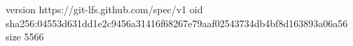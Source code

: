 version https://git-lfs.github.com/spec/v1
oid sha256:04553d631dd1e2c9456a31416f68267e79aaf02543734db4bf8d163893a06a56
size 5566
